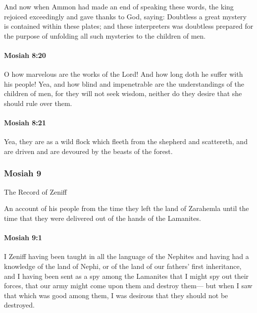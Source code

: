 			And now when Ammon had made an end of speaking these words,
			the king rejoiced exceedingly and gave thanks to God, saying:
			Doubtless a great mystery is contained within these plates;
			and these interpreters was doubtless prepared
			for the purpose of unfolding all such mysteries to the children of men.

		\paragraph{Mosiah 8:20} %
			\label{MOSIAH-8-20}

			O how marvelous are the works of the Lord!
			And how long doth he suffer with his people!
			Yea, and how blind and impenetrable
			are the understandings of the children of men,
			for they will not seek wisdom,
			neither do they desire that she should rule over them.

		\paragraph{Mosiah 8:21} %
			\label{MOSIAH-8-21}

			Yea, they are as a wild flock which fleeth from the shepherd and scattereth,
			and are driven and are devoured by the beasts of the forest.

	\subsubsection{Mosiah 9} %
		\label{MOSIAH-9}
		
		The Record of Zeniff

		An account of his people from the time they left the land of Zarahemla
		until the time that they were delivered out of the hands of the Lamanites.
		
		\paragraph{Mosiah 9:1} %
			\label{MOSIAH-9-1}

			I Zeniff having been taught in all the language of the Nephites
			and having had a knowledge of the land of Nephi,
			or of the land of our fathers' first inheritance,
			and I having been sent as a spy among the Lamanites
			that I might spy out their forces,
			that our army might come upon them and destroy them---
			but when I saw that which was good among them,
			I was desirous that they should not be destroyed.


